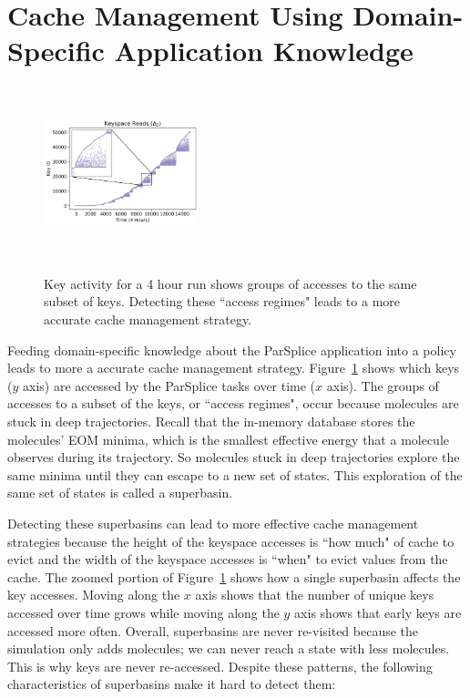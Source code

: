 \section{Cache Management Using Domain-Specific Application Knowledge}
\label{sec:dom-specific}
\begin{figure}[t]
  \noindent\includegraphics[height=5cm,width=0.4\textwidth]{figures/keyspace-zoomed.png}\\

  \caption{Key activity for a 4 hour run shows groups of accesses to the same
  subset of keys. Detecting these ``access regimes" leads to a more accurate cache
  management strategy.\label{fig:keyspace-zoomed}}

\end{figure}

Feeding domain-specific knowledge about the ParSplice application into a policy
leads to more a accurate cache management strategy.
Figure~\ref{fig:keyspace-zoomed} shows which keys (\(y\) axis) are accessed by
the ParSplice tasks over time (\(x\) axis). The groups of accesses to a subset
of the keys, or ``access regimes", occur because molecules are stuck in deep
trajectories. Recall that the in-memory database stores the molecules' EOM
minima, which is the smallest effective energy that a molecule observes during
its trajectory. So molecules stuck in deep trajectories explore the same minima
until they can escape to a new set of states. This exploration of the same set
of states is called a superbasin. 

Detecting these superbasins can lead to more effective cache management
strategies because the height of the keyspace accesses is ``how much" of cache
to evict and the width of the keyspace accesses is ``when" to evict values from
the cache.  The zoomed portion of Figure~\ref{fig:keyspace-zoomed} shows how a
single superbasin affects the key accesses. Moving along the \(x\) axis shows
that the number of unique keys accessed over time grows while moving along the
\(y\) axis shows that early keys are accessed more often.  Overall, superbasins
are never re-visited because the simulation only adds molecules; we can never
reach a state with less molecules. This is why keys are never re-accessed.
Despite these patterns, the following characteristics of superbasins make it
hard to detect them:

